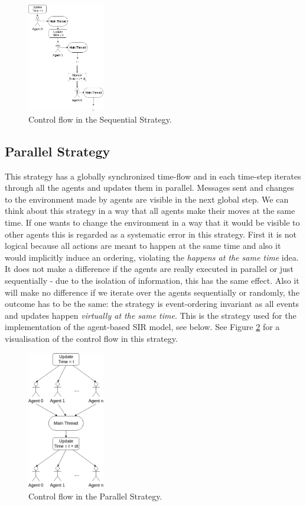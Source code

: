 \begin{figure}[H]
	\centering
	\includegraphics[width=0.3\textwidth, angle=0]{./fig/fpabs/timedriven/sequential.png}
	\caption{Control flow in the Sequential Strategy.}
	\label{fig:strategy_seq}
\end{figure}

\subsection{Parallel Strategy}
This strategy has a globally synchronized time-flow and in each time-step iterates through all the agents and updates them in parallel. Messages sent and changes to the environment made by agents are visible in the next global step. We can think about this strategy in a way that all agents make their moves at the same time.  If one wants to change the environment in a way that it would be visible to other agents this is regarded as a systematic error in this strategy. First it is not logical because all actions are meant to happen at the same time and also it would implicitly induce an ordering, violating the \textit{happens at the same time} idea. 
It does not make a difference if the agents are really executed in parallel or just sequentially - due to the isolation of information, this has the same effect. Also it will make no difference if we iterate over the agents sequentially or randomly, the outcome has to be the same: the strategy is event-ordering invariant as all events and updates happen \textit{virtually at the same time}. This is the strategy used for the implementation of the agent-based SIR model, see below. See Figure \ref{fig:strategy_par} for a visualisation of the control flow in this strategy.

\begin{figure}[H]
	\centering
	\includegraphics[width=0.3\textwidth, angle=0]{./fig/fpabs/timedriven/parallel.png}
	\caption{Control flow in the Parallel Strategy.}
	\label{fig:strategy_par}
\end{figure}

